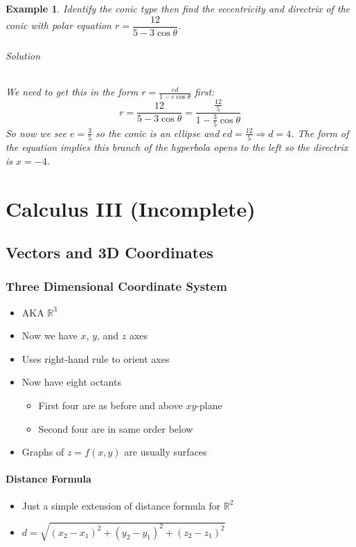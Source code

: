 \documentclass[letterpaper, 11pt, openany]{book}
\theoremstyle{mytheoremstyle}
\theoremstyle{myexamplestyle}
\newtheorem{example}{Example}[section]
\newenvironment{solution}{\paragraph{\sffamily \smaller \fontseries{b}\selectfont Solution}}{\hfill\faSquare}
\begin{document}
\begin{example}
    Identify the conic type then find the eccentricity and directrix of the conic with polar equation $r = \dfrac{12}{5 - 3\cos \theta}$.
    \begin{solution}
        We need to get this in the form $\displaystyle r = \frac{ed}{1 - e\cos \theta}$ first:
        \[r = \frac{12}{5 - 3\cos \theta} = \frac{\frac{12}{5}}{1 - \frac{3}{5}\cos \theta}\]
        So now we see $e = \frac{3}{5}$ so the conic is an ellipse and $ed = \frac{12}{5} \Rightarrow d = 4$. The form of the equation implies this branch of the hyperbola opens to the left so the directrix is $x = -4$.
    \end{solution}

\end{example}

\newpage
\part{Calculus III (Incomplete)}
\thispagestyle{firstofchapter}
\chapter{Vectors and 3D Coordinates}
\section{Three Dimensional Coordinate System}
\setcounter{figure}{0}


\begin{itemize}
    \item AKA $\mathbb{R}^{3}$
    \item Now we have $x$, $y$, and $z$ axes
    \item Uses right-hand rule to orient axes
    \item Now have eight octants
    \begin{itemize}
        \item First four are as before and above $xy$-plane
        \item Second four are in same order below
    \end{itemize}
    \item Graphs of $z = f(x,y)$ are usually surfaces
\end{itemize}

\subsection{Distance Formula}
\begin{itemize}
    \item Just a simple extension of distance formula for $\mathbb{R}^{2}$
    \item $d = \sqrt{(x_{2} - x_{1})^{2} + (y_{2} - y_{1})^{2} + (z_{2} - z_{1})^{2}}$
\end{itemize}
\end{document}
